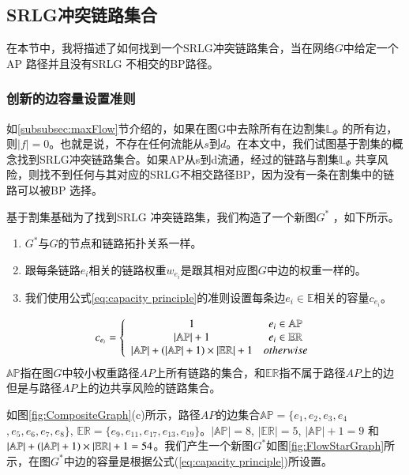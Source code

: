 \subsection{SRLG冲突链路集合}
在本节中，我将描述了如何找到一个SRLG冲突链路集合，当在网络$G$中给定一个AP 路径并且没有SRLG 不相交的BP路径。
\subsubsection{创新的边容量设置准则}
如\ref{subsubsec:maxFlow}节介绍的，如果在图G中去除所有在边割集$\mathbb{\mathbb{L}}_{\Phi}$ 的所有边，则$|f| = 0$。也就是说，不存在任何流能从$s$到$d$。在本文中，我们试图基于割集的概念找到SRLG冲突链路集合。如果AP从s到d流通，经过的链路与割集$\mathbb{\mathbb{L}}_{\Phi}$ 共享风险，则找不到任何与其对应的SRLG不相交路径BP，因为没有一条在割集中的链路可以被BP 选择。

基于割集基础为了找到SRLG 冲突链路集，我们构造了一个新图$G^*$ ，如下所示。
\begin{enumerate}
  \item $G^*$与$G$的节点和链路拓扑关系一样。
  \item 跟每条链路$e_i$相关的链路权重$w_{e_i}$是跟其相对应图$G$中边的权重一样的。
  \item 我们使用公式\ref{eq:capacity principle}的准则设置每条边$e_i \in \mathbb{E}$相关的容量$c_{e_i}$。
\end{enumerate}
\begin{equation}
c_{e_i} = \left\{ {\begin{array}{*{20}{c}}
   1 & {e_i{\rm{ }} \in {\rm{ \mathbb{AP}}}}  \\
   {\left| \mathbb{AP} \right|+1} & {e_i{\rm{ }} \in {\rm{ \mathbb{E}}}{{\rm{\mathbb{R}}}}}  \\
   {\left| {{\rm\mathbb{AP}}} \right| + \left( {\left| {{\rm\mathbb{AP}}} \right| + 1} \right)\times \left| {{\rm{\mathbb{E}}}{{\rm{\mathbb{R}}}}} \right| + 1} & {otherwise}  \\
\end{array}} \right.
\label{eq:capacity principle}
\end{equation}
$\mathbb{AP}$指在图$G$中较小权重路径$AP$上所有链路的集合，和$\mathbb{\mathbb{ER}}$指不属于路径$AP$上的边但是与路径$AP$上的边共享风险的链路集合。

如图\ref{fig:CompositeGraph}(c)所示，路径$AP$的边集合$\mathbb{AP}=\{e_1,e_2,e_3,e_4$
$,e_5,e_6,e_7,e_8\}$, $\mathbb{\mathbb{ER}}=\{e_9,e_{11},e_{17},e_{13},e_{19}\}$。$|\mathbb{AP}|=8$, $|\mathbb{\mathbb{ER}}|=5$, $|\mathbb{AP}|+1=9$ 和 ${\left| {{\rm{\mathbb{AP}}}} \right| + \left( {\left| {{\rm{\mathbb{AP}}}} \right| + 1} \right)\times \left| {{\rm{\mathbb{E}}}{{\rm{\mathbb{R}}}}} \right| + 1}=54$。我们产生一个新图$G^*$如图\ref{fig:FlowStarGraph}所示，在图$G^*$中边的容量是根据公式(\ref{eq:capacity principle})所设置。

